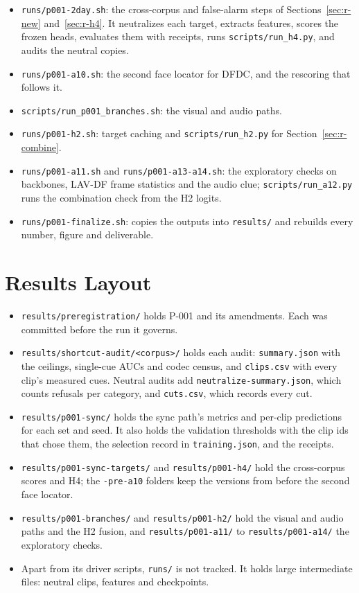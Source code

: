 \begin{itemize}
    \item \texttt{runs/p001-2day.sh}: the cross-corpus and false-alarm steps
    of Sections~\ref{sec:r-new} and~\ref{sec:r-h4}. It neutralizes each target, extracts
    features, scores the frozen heads, evaluates them with receipts, runs
    \texttt{scripts/run\_h4.py}, and audits the neutral copies.
    \item \texttt{runs/p001-a10.sh}: the second face locator for DFDC,
    and the rescoring that follows it.
    \item \texttt{scripts/run\_p001\_branches.sh}: the visual and audio paths.
    \item \texttt{runs/p001-h2.sh}: target caching and
    \texttt{scripts/run\_h2.py} for Section~\ref{sec:r-combine}.
    \item \texttt{runs/p001-a11.sh} and \texttt{runs/p001-a13-a14.sh}: the
    exploratory checks on backbones, LAV-DF frame statistics and the audio clue; \texttt{scripts/run\_a12.py} runs the combination check from the H2 logits.
    \item \texttt{runs/p001-finalize.sh}: copies the outputs into
    \texttt{results/} and rebuilds every number, figure and deliverable.
\end{itemize}

\section{Results Layout}

\begin{itemize}
    \item \texttt{results/preregistration/} holds P-001 and its amendments.
    Each was committed before the run it governs.
    \item \texttt{results/shortcut-audit/<corpus>/} holds each audit:
    \texttt{summary.json} with the ceilings, single-cue AUCs and codec census,
    and \texttt{clips.csv} with every clip's measured cues. Neutral audits add
    \texttt{neutralize-summary.json}, which counts refusals per category, and
    \texttt{cuts.csv}, which records every cut.
    \item \texttt{results/p001-sync/} holds the sync path's metrics and
    per-clip predictions for each set and seed. It also holds the validation
    thresholds with the clip ids that chose them, the selection record in
    \texttt{training.json}, and the receipts.
    \item \texttt{results/p001-sync-targets/} and \texttt{results/p001-h4/}
    hold the cross-corpus scores and H4; the \texttt{-pre-a10} folders keep
    the versions from before the second face locator.
    \item \texttt{results/p001-branches/} and \texttt{results/p001-h2/} hold
    the visual and audio paths and the H2 fusion, and
    \texttt{results/p001-a11/} to \texttt{results/p001-a14/} the exploratory
    checks.
    \item Apart from its driver scripts, \texttt{runs/} is not tracked. It
    holds large intermediate files: neutral clips, features and checkpoints.
\end{itemize}

